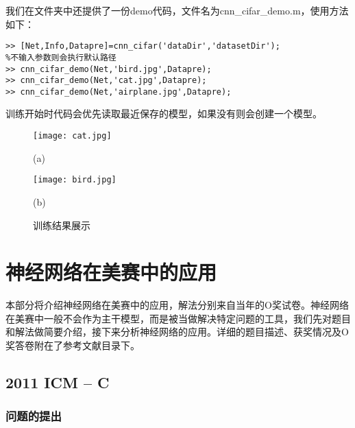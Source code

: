 \documentclass[bwprint]{cumcmthesis}
\begin{document}
我们在文件夹中还提供了一份demo代码，文件名为cnn\_cifar\_demo.m，使用方法如下：

\lstset{language=MatLab}
\begin{lstlisting}
>> [Net,Info,Datapre]=cnn_cifar('dataDir','datasetDir');
%不输入参数则会执行默认路径
>> cnn_cifar_demo(Net,'bird.jpg',Datapre);
>> cnn_cifar_demo(Net,'cat.jpg',Datapre);
>> cnn_cifar_demo(Net,'airplane.jpg',Datapre);
\end{lstlisting}

训练开始时代码会优先读取最近保存的模型，如果没有则会创建一个模型。

\begin{figure}[!h] 
	\begin{minipage}[t]{0.5\linewidth}%
		\centering  
		\texttt{[image: cat.jpg]}  
		\caption*{(a)}   
	\end{minipage}  
	\begin{minipage}[t]{0.5\linewidth}%
		\centering  
		\texttt{[image: bird.jpg]}  
		\caption*{(b)}%
	\end{minipage}  
	\caption{训练结果展示}%
	\label{cifarDemo}
\end{figure} 



\section{神经网络在美赛中的应用}

本部分将介绍神经网络在美赛中的应用，解法分别来自当年的O奖试卷。神经网络在美赛中一般不会作为主干模型，而是被当做解决特定问题的工具，我们先对题目和解法做简要介绍，接下来分析神经网络的应用。详细的题目描述、获奖情况及O奖答卷附在了参考文献目录下。

\subsection{2011 ICM -- C}

\subsubsection{问题的提出}
\end{document}
